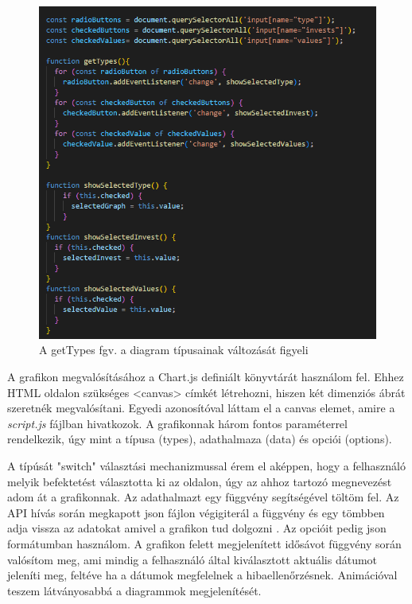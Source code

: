 \begin{figure}[h]
\centering
\includegraphics[scale=0.5]{images/types.png}
\caption{A getTypes fgv. a diagram típusainak változását figyeli}
\label{fig:fetch}
\end{figure}

A grafikon megvalósításához a Chart.js definiált könyvtárát használom fel. Ehhez HTML oldalon szükséges <canvas> címkét létrehozni, hiszen két dimenziós ábrát szeretnék megvalósítani. Egyedi azonosítóval láttam el a canvas elemet, amire a \emph{script.js} fájlban hivatkozok. A grafikonnak három fontos paraméterrel rendelkezik, úgy mint a típusa (types), adathalmaza (data) és opciói (options).

	A típúsát "switch" választási mechanizmussal érem el aképpen, hogy a felhasználó melyik befektetést választotta ki az oldalon, úgy az ahhoz tartozó megnevezést adom át a grafikonnak. 
Az adathalmazt egy függvény segítségével töltöm fel. Az API hívás során megkapott json fájlon végigiterál a függvény és egy tömbben adja vissza az adatokat amivel a grafikon tud dolgozni . Az opcióit pedig json formátumban használom. A grafikon felett megjelenített idősávot függvény során valósítom meg, ami mindig a felhasználó által kiválasztott aktuális dátumot jeleníti meg, feltéve ha a dátumok megfelelnek a hibaellenőrzésnek. Animációval teszem látványosabbá a diagrammok megjelenítését.

